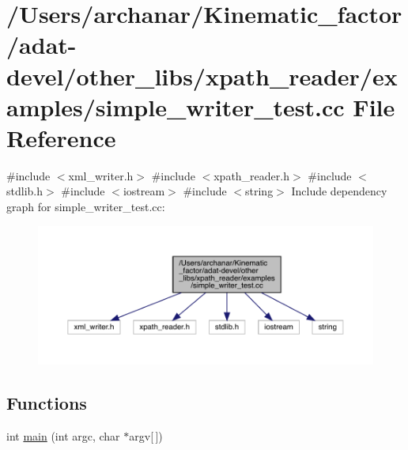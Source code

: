 \hypertarget{adat-devel_2other__libs_2xpath__reader_2examples_2simple__writer__test_8cc}{}\section{/\+Users/archanar/\+Kinematic\+\_\+factor/adat-\/devel/other\+\_\+libs/xpath\+\_\+reader/examples/simple\+\_\+writer\+\_\+test.cc File Reference}
\label{adat-devel_2other__libs_2xpath__reader_2examples_2simple__writer__test_8cc}
{\ttfamily \#include $<$xml\+\_\+writer.\+h$>$}\newline
{\ttfamily \#include $<$xpath\+\_\+reader.\+h$>$}\newline
{\ttfamily \#include $<$stdlib.\+h$>$}\newline
{\ttfamily \#include $<$iostream$>$}\newline
{\ttfamily \#include $<$string$>$}\newline
Include dependency graph for simple\+\_\+writer\+\_\+test.\+cc\+:
\nopagebreak
\begin{figure}[H]
\begin{center}
\leavevmode
\includegraphics[width=350pt]{d8/d67/adat-devel_2other__libs_2xpath__reader_2examples_2simple__writer__test_8cc__incl}
\end{center}
\end{figure}
\subsection*{Functions}
\begin{DoxyCompactItemize}
\item 
int \mbox{\hyperlink{adat-devel_2other__libs_2xpath__reader_2examples_2simple__writer__test_8cc_a0ddf1224851353fc92bfbff6f499fa97}{main}} (int argc, char $\ast$argv\mbox{[}$\,$\mbox{]})
\end{DoxyCompactItemize}


